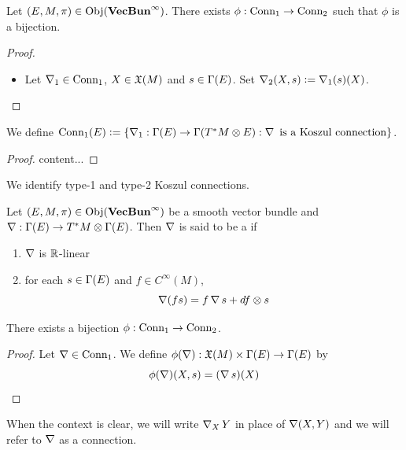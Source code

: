 \documentclass{book}
\begin{document}
	\begin{ex}
		Let $(E, M, \pi) \in \operatorname{Obj}(\operatorname*{\text{\textbf{VecBun}}^{\infty}})$. There exists $\phi: \operatorname{\text{Conn}}_1 \rightarrow \operatorname{\text{Conn}}_2$ such that $\phi$ is a bijection. 
	\end{ex}

	\begin{proof}
		\begin{itemize}
			\item Let $\operatorname{\nabla}_1 \in \operatorname{\text{Conn}}_1$, $X \in \mathfrak{X}(M)$ and $s \in \Gamma(E)$. Set $\operatorname{\nabla}_2(X, s) \vcentcolon= \operatorname{\nabla}_1(s)(X)$. 
		\end{itemize}
	\end{proof}

	\begin{ex}
		We define $\operatorname{\text{Conn}}_1(E) \vcentcolon= \{\operatorname{\nabla}_1 : \Gamma(E) \rightarrow \Gamma(T^*M \otimes E): \operatorname{\nabla} \text{ is a Koszul connection}\}$.
	\end{ex}

	\begin{proof}
		content...
	\end{proof}

	\begin{note}
		We identify type-1 and type-2 Koszul connections.	
	\end{note}

	\begin{defn}
		Let $(E, M, \pi) \in \operatorname{Obj}(\operatorname*{\text{\textbf{VecBun}}^{\infty}})$ be a smooth vector bundle and $\operatorname{\nabla} : \Gamma(E) \rightarrow T^*M \otimes \Gamma(E)$. Then $\operatorname{\nabla}$ is said to be a  if 
		\begin{enumerate}
			\item $\operatorname{\nabla}$ is $\mathbb{R}$-linear
			\item for each $s \in \Gamma(E)$ and $f \in C^{\infty}(M)$, 
			$$\operatorname{\nabla}(fs) = f \operatorname{\nabla} s + df \otimes s $$ 
		\end{enumerate}
	\end{defn}

	\begin{ex}
		There exists a bijection $\phi:  \operatorname{\text{Conn}}_1 \rightarrow \operatorname{\text{Conn}}_2$.
	\end{ex}

	\begin{proof}
		Let $\operatorname{\nabla} \in \operatorname{\text{Conn}}_1$. We define $\phi(\operatorname{\nabla}): \mathfrak{X}(M) \times \Gamma(E) \rightarrow \Gamma(E)$ by $$\phi(\operatorname{\nabla})(X, s) = (\operatorname{\nabla} s)(X)$$
	\end{proof}

	\begin{note}
		When the context is clear, we will write $\operatorname{\nabla}_X Y$ in place of $\operatorname{\nabla}(X,Y)$ and we will refer to $\operatorname{\nabla}$ as a connection.
	\end{note}
\end{document}
